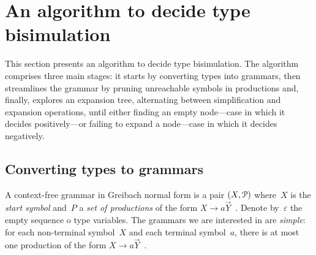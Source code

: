 \section{An algorithm to decide type bisimulation}
\label{sec:algorithm}



This section presents an algorithm to decide type bisimulation. The
algorithm comprises three main stages: it starts by converting types
into grammars, then streamlines the grammar by pruning unreachable
symbols in productions and, finally, explores an expansion tree,
alternating between simplification and expansion operations, until
either finding an empty node---case in which it decides
positively---or failing to expand a node---case in which it decides
negatively.

\subsection{Converting types to grammars}
\label{subsec:typeToGrammar}

A context-free grammar in Greibach normal form is a pair
$(X,\mathcal P)$ where~$X$ is the \emph{start symbol} and~$P$ a
\emph{set of productions} of the form
$X \rightarrow a\vec Y$~\cite{GNF}. Denote by~$\varepsilon$ the empty
sequence o type variables.
%
The grammars we are interested in are \emph{simple}: for each
non-terminal symbol~$X$ and each terminal symbol~$a$, there is at most
one production of the form
$X \rightarrow a\vec Y$~\cite{simpleGrammar}.


